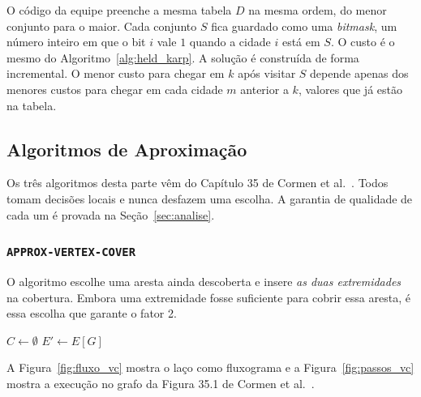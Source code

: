 \documentclass[conference]{IEEEtran}
\theoremstyle{definition}
\theoremstyle{plain}
\begin{document}
O código da equipe preenche a mesma tabela $D$ na mesma ordem, do menor conjunto para o maior. Cada conjunto $S$ fica guardado como uma \textit{bitmask}, um número inteiro em que o bit $i$ vale $1$ quando a cidade $i$ está em $S$. O custo é o mesmo do Algoritmo~\ref{alg:held_karp}. A solução é construída de forma incremental. O menor custo para chegar em $k$ após visitar $S$ depende apenas dos menores custos para chegar em cada cidade $m$ anterior a $k$, valores que já estão na tabela.

\subsection{Algoritmos de Aproximação}

Os três algoritmos desta parte vêm do Capítulo 35 de Cormen et al.~\cite{cormen2012algoritmos}. Todos tomam decisões locais e nunca desfazem uma escolha. A garantia de qualidade de cada um é provada na Seção~\ref{sec:analise}.

\subsubsection{\texttt{APPROX-VERTEX-COVER}}

O algoritmo escolhe uma aresta ainda descoberta e insere \textit{as duas extremidades} na cobertura. Embora uma extremidade fosse suficiente para cobrir essa aresta, é essa escolha que garante o fator 2.

\begin{algorithm}[htbp]
\caption{\texttt{APPROX-VERTEX-COVER}$(G)$ \cite{cormen2012algoritmos}}
\label{alg:approx_vc}
$C \leftarrow \emptyset$\;
$E' \leftarrow E[G]$\;
\;
\end{algorithm}

A Figura~\ref{fig:fluxo_vc} mostra o laço como fluxograma e a Figura~\ref{fig:passos_vc} mostra a execução no grafo da Figura 35.1 de Cormen et al.~\cite{cormen2012algoritmos}.
\end{document}
